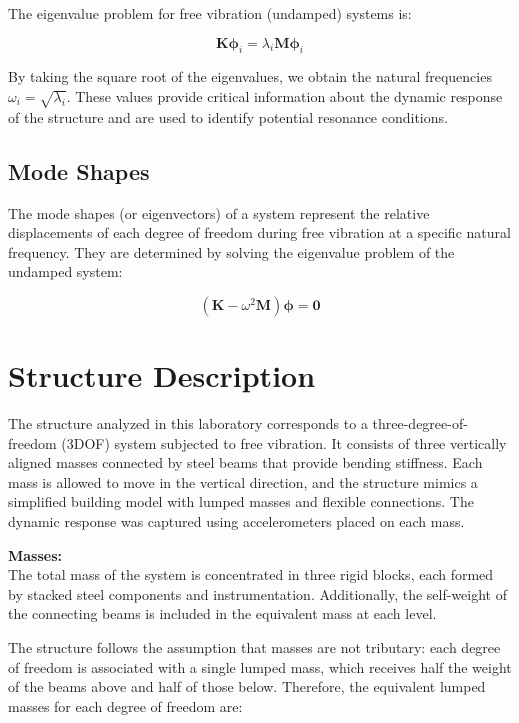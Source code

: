 \documentclass{article}  %
\begin{document}
The eigenvalue problem for free vibration (undamped) systems is:

\begin{equation}
\mathbf{K} \boldsymbol{\phi}_i = \lambda_i \mathbf{M} \boldsymbol{\phi}_i
\end{equation}

By taking the square root of the eigenvalues, we obtain the natural frequencies $\omega_i = \sqrt{\lambda_i}$. These values provide critical information about the dynamic response of the structure and are used to identify potential resonance conditions.

\subsection{Mode Shapes}
The mode shapes (or eigenvectors) of a system represent the relative displacements of each degree of freedom during free vibration at a specific natural frequency. They are determined by solving the eigenvalue problem of the undamped system:

\begin{equation}
\left( \mathbf{K} - \omega^2 \mathbf{M} \right) \boldsymbol{\phi} = \mathbf{0}
\end{equation}




\newpage
\section{Structure Description}

The structure analyzed in this laboratory corresponds to a three-degree-of-freedom (3DOF) system subjected to free vibration. It consists of three vertically aligned masses connected by steel beams that provide bending stiffness. Each mass is allowed to move in the vertical direction, and the structure mimics a simplified building model with lumped masses and flexible connections. The dynamic response was captured using accelerometers placed on each mass.

\textbf{Masses:} \\
The total mass of the system is concentrated in three rigid blocks, each formed by stacked steel components and instrumentation. Additionally, the self-weight of the connecting beams is included in the equivalent mass at each level. 

The structure follows the assumption that masses are not tributary: each degree of freedom is associated with a single lumped mass, which receives half the weight of the beams above and half of those below. Therefore, the equivalent lumped masses for each degree of freedom are:
\end{document}
